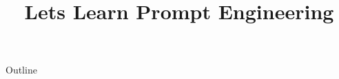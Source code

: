 \documentclass[xcolor=dvipsnames,compress,t,pdf,9pt]{beamer}
\title[\insertframenumber /\inserttotalframenumber]{Lets Learn Prompt Engineering}
\begin{document}
	\begin{frame}
	\titlepage
	\end{frame}
	
	\begin{frame}{Outline}
	    \tableofcontents
	\end{frame}

	
	
\end{document}
